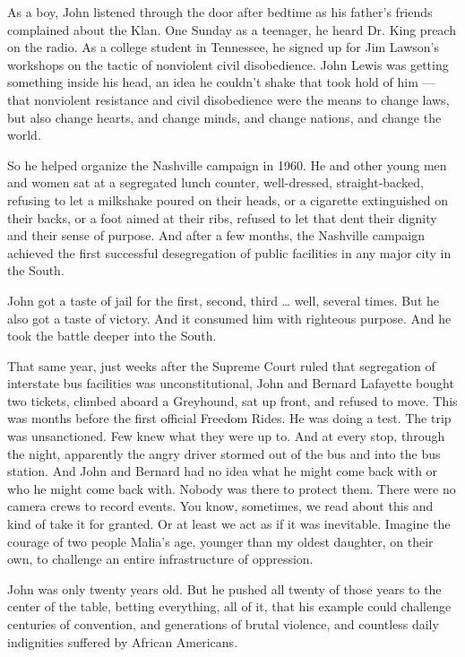 As a boy, John listened through the door after bedtime as his father's
friends complained about the Klan. One Sunday as a teenager, he heard
Dr. King preach on the radio. As a college student in Tennessee, he
signed up for Jim Lawson's workshops on the tactic of nonviolent civil
disobedience. John Lewis was getting something inside his head, an idea
he couldn't shake that took hold of him --- that nonviolent resistance
and civil disobedience were the means to change laws, but also change
hearts, and change minds, and change nations, and change the world.

So he helped organize the Nashville campaign in 1960. He and other young
men and women sat at a segregated lunch counter, well-dressed,
straight-backed, refusing to let a milkshake poured on their heads, or a
cigarette extinguished on their backs, or a foot aimed at their ribs,
refused to let that dent their dignity and their sense of purpose. And
after a few months, the Nashville campaign achieved the first successful
desegregation of public facilities in any major city in the South.

John got a taste of jail for the first, second, third \ldots{} well,
several times. But he also got a taste of victory. And it consumed him
with righteous purpose. And he took the battle deeper into the South.

That same year, just weeks after the Supreme Court ruled that
segregation of interstate bus facilities was unconstitutional, John and
Bernard Lafayette bought two tickets, climbed aboard a Greyhound, sat up
front, and refused to move. This was months before the first official
Freedom Rides. He was doing a test. The trip was unsanctioned. Few knew
what they were up to. And at every stop, through the night, apparently
the angry driver stormed out of the bus and into the bus station. And
John and Bernard had no idea what he might come back with or who he
might come back with. Nobody was there to protect them. There were no
camera crews to record events. You know, sometimes, we read about this
and kind of take it for granted. Or at least we act as if it was
inevitable. Imagine the courage of two people Malia's age, younger than
my oldest daughter, on their own, to challenge an entire infrastructure
of oppression.

John was only twenty years old. But he pushed all twenty of those years
to the center of the table, betting everything, all of it, that his
example could challenge centuries of convention, and generations of
brutal violence, and countless daily indignities suffered by African
Americans.

